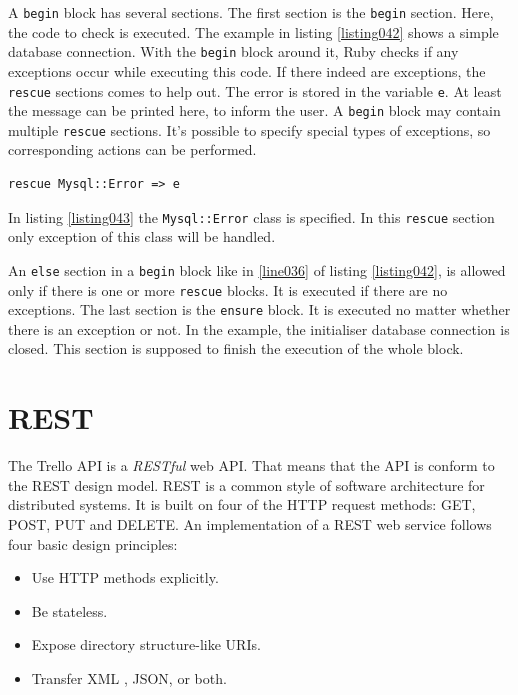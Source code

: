 A \lstinline{begin} block has several sections. The first section is the \lstinline{begin} section. Here, the code to check is executed. The example in listing \ref{listing042} shows a simple database connection. With the \lstinline{begin} block around it, Ruby checks if any exceptions occur while executing this code. If there indeed are exceptions, the \lstinline{rescue} sections comes to help out. The error is stored in the variable \lstinline{e}. At least the message can be printed here, to inform the user. A \lstinline{begin} block may contain multiple \lstinline{rescue} sections. It's possible to specify special types of exceptions, so corresponding actions can be performed. 

\begin{lstlisting}[aboveskip=1\baselineskip, caption=\texttt{joomlaMultiple.rb} usage., label=listing043]
rescue Mysql::Error => e
\end{lstlisting}

In listing \ref{listing043} the \lstinline{Mysql::Error} class is specified. In this \lstinline{rescue} section only exception of this class will be handled.

An \lstinline{else} section in a \lstinline{begin} block like in \ref{line036} of listing \ref{listing042}, is allowed only if there is one or more \lstinline{rescue} blocks. It is executed if there are no exceptions. The last section is the \lstinline{ensure} block. It is executed no matter whether there is an exception or not. In the example, the initialiser database connection is closed. This section is supposed to finish the execution of the whole block.

\section{REST}
The Trello API is a \emph{RESTful} web API. That means that the API is conform to the REST design model. REST is a common style of software architecture for distributed systems. It is built on four of the HTTP request methods: GET, POST, PUT and DELETE. An implementation of a REST web service follows four basic design principles:
\begin{itemize}
	\item Use HTTP methods explicitly.
	\item Be stateless.
	\item Expose directory structure-like URIs.
	\item Transfer XML , JSON, or both.
\end{itemize}
\cite{rest}

